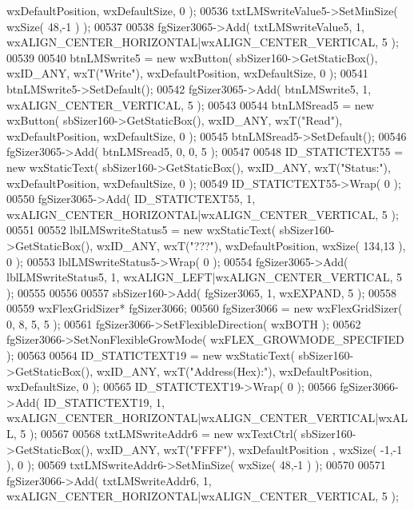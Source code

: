 \begin{DoxyCode}
      wxDefaultPosition, wxDefaultSize, 0 );
00536     txtLMSwriteValue5->SetMinSize( wxSize( 48,-1 ) );
00537     
00538     fgSizer3065->Add( txtLMSwriteValue5, 1, wxALIGN\_CENTER\_HORIZONTAL|wxALIGN\_CENTER\_VERTICAL, 5 );
00539     
00540     btnLMSwrite5 = \textcolor{keyword}{new} wxButton( sbSizer160->GetStaticBox(), wxID\_ANY, wxT(\textcolor{stringliteral}{"Write"}), wxDefaultPosition, 
      wxDefaultSize, 0 );
00541     btnLMSwrite5->SetDefault(); 
00542     fgSizer3065->Add( btnLMSwrite5, 1, wxALIGN\_CENTER\_VERTICAL, 5 );
00543     
00544     btnLMSread5 = \textcolor{keyword}{new} wxButton( sbSizer160->GetStaticBox(), wxID\_ANY, wxT(\textcolor{stringliteral}{"Read"}), wxDefaultPosition, 
      wxDefaultSize, 0 );
00545     btnLMSread5->SetDefault(); 
00546     fgSizer3065->Add( btnLMSread5, 0, 0, 5 );
00547     
00548     ID_STATICTEXT55 = \textcolor{keyword}{new} wxStaticText( sbSizer160->GetStaticBox(), wxID\_ANY, wxT(\textcolor{stringliteral}{"Status:"}), 
      wxDefaultPosition, wxDefaultSize, 0 );
00549     ID_STATICTEXT55->Wrap( 0 );
00550     fgSizer3065->Add( ID_STATICTEXT55, 1, wxALIGN\_CENTER\_HORIZONTAL|wxALIGN\_CENTER\_VERTICAL, 5 );
00551     
00552     lblLMSwriteStatus5 = \textcolor{keyword}{new} wxStaticText( sbSizer160->GetStaticBox(), wxID\_ANY, wxT(\textcolor{stringliteral}{"???"}), 
      wxDefaultPosition, wxSize( 134,13 ), 0 );
00553     lblLMSwriteStatus5->Wrap( 0 );
00554     fgSizer3065->Add( lblLMSwriteStatus5, 1, wxALIGN\_LEFT|wxALIGN\_CENTER\_VERTICAL, 5 );
00555     
00556     
00557     sbSizer160->Add( fgSizer3065, 1, wxEXPAND, 5 );
00558     
00559     wxFlexGridSizer* fgSizer3066;
00560     fgSizer3066 = \textcolor{keyword}{new} wxFlexGridSizer( 0, 8, 5, 5 );
00561     fgSizer3066->SetFlexibleDirection( wxBOTH );
00562     fgSizer3066->SetNonFlexibleGrowMode( wxFLEX\_GROWMODE\_SPECIFIED );
00563     
00564     ID_STATICTEXT19 = \textcolor{keyword}{new} wxStaticText( sbSizer160->GetStaticBox(), wxID\_ANY, wxT(\textcolor{stringliteral}{"Address(Hex):"}), 
      wxDefaultPosition, wxDefaultSize, 0 );
00565     ID_STATICTEXT19->Wrap( 0 );
00566     fgSizer3066->Add( ID_STATICTEXT19, 1, wxALIGN\_CENTER\_HORIZONTAL|wxALIGN\_CENTER\_VERTICAL|wxALL, 5 );
00567     
00568     txtLMSwriteAddr6 = \textcolor{keyword}{new} wxTextCtrl( sbSizer160->GetStaticBox(), wxID\_ANY, wxT(\textcolor{stringliteral}{"FFFF"}), wxDefaultPosition
      , wxSize( -1,-1 ), 0 );
00569     txtLMSwriteAddr6->SetMinSize( wxSize( 48,-1 ) );
00570     
00571     fgSizer3066->Add( txtLMSwriteAddr6, 1, wxALIGN\_CENTER\_HORIZONTAL|wxALIGN\_CENTER\_VERTICAL, 5 );

\end{DoxyCode}
